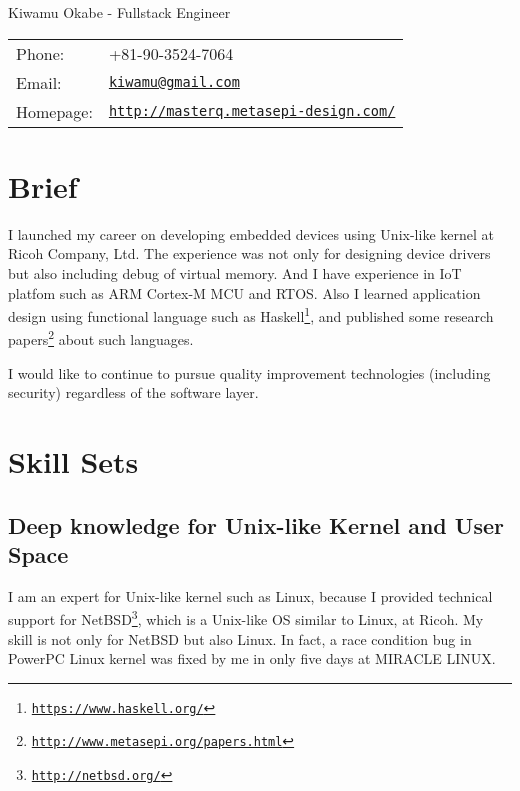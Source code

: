 \documentclass[letterpaper]{article}
\def\name{Kiwamu Okabe - Fullstack Engineer}
\begin{document}
{\huge \name}


\vspace{0.25in}

\begin{minipage}{0.3\linewidth}
  \begin{tabular}{ll}
    Phone: & +81-90-3524-7064 \\
    Email: & \href{mailto:kiwamu@gmail.com}{\tt kiwamu@gmail.com} \\
    Homepage: & \href{http://masterq.metasepi-design.com/}{\tt http://masterq.metasepi-design.com/} \\
  \end{tabular}
\end{minipage}

\section*{Brief}

I launched my career on developing embedded devices using Unix-like kernel at Ricoh Company, Ltd. The experience was not only for designing device drivers but also including debug of virtual memory. And I have experience in IoT platfom such as ARM Cortex-M MCU and RTOS. Also I learned application design using functional language such as Haskell\footnote{\href{https://www.haskell.org/}{\tt https://www.haskell.org/}}, and published some research papers\footnote{\href{http://www.metasepi.org/papers.html}{\tt http://www.metasepi.org/papers.html}} about such languages.

I would like to continue to pursue quality improvement technologies (including security) regardless of the software layer.

\section*{Skill Sets}

\subsection*{Deep knowledge for Unix-like Kernel and User Space}

I am an expert for Unix-like kernel such as Linux, because I provided technical support for NetBSD\footnote{\href{http://netbsd.org/}{\tt http://netbsd.org/}}, which is a Unix-like OS similar to Linux, at Ricoh. My skill is not only for NetBSD but also Linux. In fact, a race condition bug in PowerPC Linux kernel was fixed by me in only five days at MIRACLE LINUX.
\end{document}
